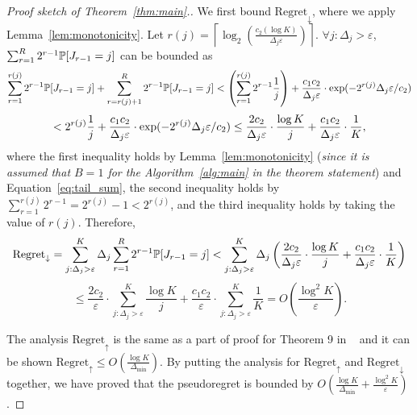 \begin{proof}[Proof sketch of Theorem~\ref{thm:main}.]
	
We first bound $\text{Regret}_{\downarrow}$, where we apply Lemma~\ref{lem:monotonicity}. Let $r(j) = \left\lceil \log_2\left( \frac{c_2(\log K)}{\Delta_j\varepsilon}\right) \right\rceil$. $\forall j: \Delta_j > \varepsilon$, $\sum_{r=1}^{R} 2^{r-1}\mathbb{P}[J_{r-1} = j]$ can be bounded as
$$
\sum_{r=1}^{r(j)} 2^{r-1}\mathbb{P}[J_{r-1} = j] +\sum_{r=r(j)+1}^{R} 2^{r-1}\mathbb{P}[J_{r-1} = j] 
< \left(\sum_{r=1}^{r(j)} 2^{r-1}\frac{1}{j}\right) + \frac{c_1c_2}{\Delta_j \varepsilon}\cdot \exp(-2^{r(j)}\Delta_j \varepsilon / c_2)
$$
$$
< 2^{r(j)}\frac{1}{j} + \frac{c_1c_2}{\Delta_j \varepsilon}\cdot \exp(-2^{r(j)}\Delta_j \varepsilon / c_2) \\
\leq \frac{2 c_2}{\Delta_j \varepsilon}\cdot \frac{\log K}{j} + \frac{c_1c_2}{\Delta_j \varepsilon}\cdot \frac{1}{K},
$$
where the first inequality holds by Lemma~\ref{lem:monotonicity} (\emph{since it is assumed that $B=1$ for the Algorithm~\ref{alg:main} in the theorem statement}) and Equation~\ref{eq:tail_sum}, the second inequality holds by $\sum_{r=1}^{r(j)} 2^{r-1} = 2^{r(j)}-1 < 2^{r(j)}$, and the third inequality holds by taking the value of $r(j)$.
Therefore,
$$
\text{Regret}_{\downarrow} = \sum_{j:\Delta_j > \varepsilon}^{K}\Delta_{j}\sum_{r=1}^{R} 2^{r-1}\mathbb{P}[J_{r-1} = j] < \sum_{j:\Delta_j > \varepsilon}^{K}\Delta_{j}\left(\frac{2 c_2}{\Delta_j \varepsilon}\cdot \frac{\log K}{j} + \frac{c_1c_2}{\Delta_j \varepsilon}\cdot \frac{1}{K}\right)
$$
$$
\leq  \frac{2 c_2}{\varepsilon}\cdot \sum_{j:\Delta_j > \varepsilon}^{K}\frac{\log K}{j} + \frac{c_1c_2}{\varepsilon}\cdot \sum_{j:\Delta_j > \varepsilon}^{K}\frac{1}{K} = O\left( \frac{\log^2 K}{\varepsilon} \right).
$$
	
The analysis $\text{Regret}_{\uparrow}$ is the same as a part of proof for Theorem 9 in ~\citet{hu2021near} and it can be shown $\text{Regret}_{\uparrow}\leq O\left(\frac{\log K}{\Delta_{\min}}\right)$.
By putting the analysis for $\text{Regret}_{\uparrow}$ and $\text{Regret}_{\downarrow}$ together, we have proved that the pseudoregret is bounded by $O\left(\frac{\log K}{\Delta_{\min}} + \frac{\log^2 K}{\varepsilon}\right)$.
\end{proof}

